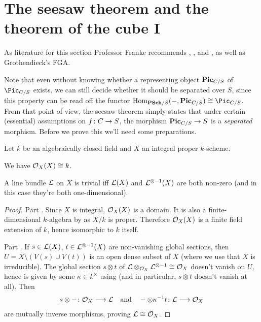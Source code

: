 \documentclass[a4paper,parskip=half,numbers=enddot, DIV=12]{scrreprt}
\begin{document}
\section{The seesaw theorem and the theorem of the cube I}
As literature for this section Professor Franke recommends \cite{mumford1974abelian}, \cite{cornell1986arithmetic}, and \cite{kleiman}, as well as Grothendieck's FGA.

Note that even without knowing whether a representing object $\mathbf{Pic}_{C/S}$ of $\Pic_{C/S}$ exists, we can still decide whether it should be separated over $S$, since this property can be read off the functor $\Hom_{\cat{PSch}/S}(-,\PIC_{C/S})\cong\Pic_{C/S}$. From that point of view, the seesaw theorem simply states that under certain (essential) assumptions on $f\colon C\morphism S$, the morphism $\PIC_{C/S}\morphism S$ is a \emph{separated} morphism. Before we prove this we'll need some preparations.
\begin{prop}
	Let $k$ be an algebraically closed field and $X$ an integral proper $k$-scheme.
	\begin{alphanumerate}
		\item We have $\mathcal{O}_X(X)\cong k$.
		\item A line bundle $\mathcal{L}$ on $X$ is trivial iff $\mathcal{L}(X)$ and $\mathcal{L}^{\otimes -1}(X)$ are both non-zero (and in this case they're both one-dimensional).
	\end{alphanumerate}
\end{prop}
\begin{proof}
	Part . Since $X$ is integral, $\mathcal{O}_X(X)$ is a domain. It is also a finite-dimensional $k$-algebra by \cite[Theorem~5]{alggeo2} as $X/k$ is proper. Therefore $\mathcal{O}_X(X)$ is a finite field extension of $k$, hence isomorphic to $k$ itself.
	
	Part . If $s\in\mathcal{L}(X)$, $t\in\mathcal{L}^{\otimes -1}(X)$ are non-vanishing global sections, then $U=X\setminus(V(s)\cup V(t))$ is an open dense subset of $X$ (where we use that $X$ is irreducible). The global section $s\otimes t$ of $\mathcal{L}\otimes_{\mathcal{O}_X}\mathcal{L}^{\otimes -1}\cong \mathcal{O}_X$ doesn't vanish on $U$, hence is given by some $\kappa\in k^\times$ using  (and in particular, $s\otimes t$ doesn't vanish at all). Then
	\begin{align*}
		s\otimes-\colon \Oo_X\morphism \Ll\quad\text{and}\quad-\otimes\kappa^{-1}t\colon \Ll\morphism\Oo_X
	\end{align*}
	are mutually inverse morphisms, proving $\mathcal{L}\cong \mathcal{O}_X$.
\end{proof}
\end{document}
